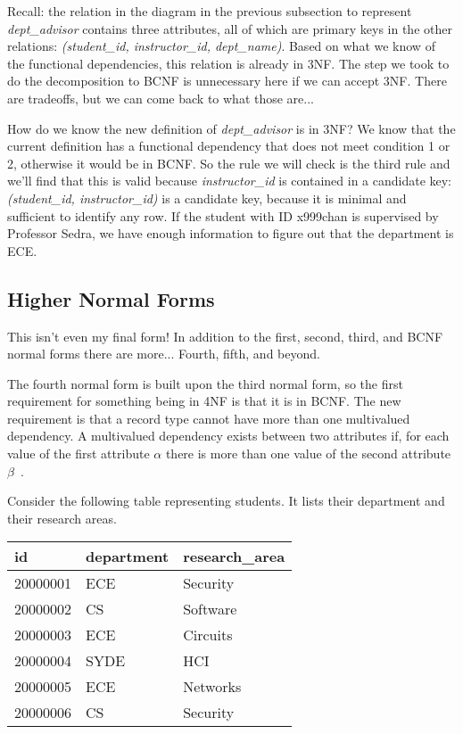 \documentclass[a4paper]{report}
\begin{document}
Recall: the relation in the diagram in the previous subsection to represent \textit{dept\_advisor} contains three attributes, all of which are primary keys in the other relations: \textit{(student\_id, instructor\_id, dept\_name)}. Based on what we know of the functional dependencies, this relation is already in 3NF. The step we took to do the decomposition to BCNF is unnecessary here if we can accept 3NF. There are tradeoffs, but we can come back to what those are...

How do we know the new definition of \textit{dept\_advisor} is in 3NF? We know that the current definition has a functional dependency that does not meet condition 1 or 2, otherwise it would be in BCNF. So the rule we will check is the third rule and we'll find that this is valid because \textit{instructor\_id} is contained in a candidate key: \textit{(student\_id, instructor\_id)} is a candidate key, because it is minimal and sufficient to identify any row. If the student with ID x999chan is supervised by Professor Sedra, we have enough information to figure out that the department is ECE.

\subsection*{Higher Normal Forms}
This isn't even my final form! In addition to the first, second, third, and BCNF normal forms there are more... Fourth, fifth, and beyond. 

The fourth normal form is built upon the third normal form, so the first requirement for something being in 4NF is that it is in BCNF. The new requirement is that a record type cannot have more than one multivalued dependency. A multivalued dependency exists between two attributes if, for each value of the first attribute $\alpha$ there is more than one value of the second attribute $\beta$~\cite{fournorm}. 

Consider the following table representing students. It lists their department and their research areas. 

\begin{center}
\begin{tabular}{|l|l|l|} \hline
	\textbf{id} & \textbf{department} & \textbf{research\_area} \\ \hline
	20000001 & ECE & Security \\ \hline
	20000002 & CS & Software \\ \hline
    20000003 & ECE & Circuits \\ \hline
    20000004 & SYDE & HCI \\ \hline
    20000005 & ECE & Networks \\ \hline
    20000006 & CS & Security \\ \hline
\end{tabular}
\end{center}
\end{document}

